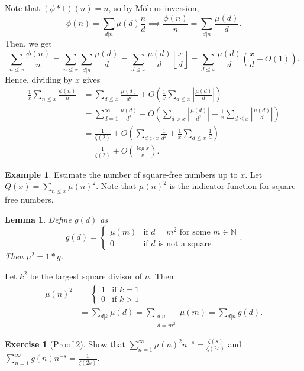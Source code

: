 \documentclass[11pt]{article}
\newtheorem{lemma}[thm]{Lemma}
\theoremstyle{definition}
\newtheorem{example}[thm]{Example}
\newtheorem{exe}[thm]{Exercise}
\newcommand{\floor}[1]{\left\lfloor #1 \right\rfloor}
\newcommand{\abs}[1]{\left\lvert#1\right\rvert} %
\newcommand{\NN}{\mathbb{N}}
\begin{document}
Note that $(\phi*1)(n)=n$, so by M\"obius inversion,
\[
\phi(n) = \sum_{d|n}\mu(d)\frac{n}d
\implies
\frac{\phi(n)}n = \sum_{d|n}\frac{\mu(d)}{d} .
\]
Then, we get
\[
\sum_{n\le x}\frac{\phi(n)}n
= \sum_{n\le x}\sum_{d|n} \frac{\mu(d)}d
= \sum_{d\le x}\frac{\mu(d)}d\floor{\frac{x}d}
= \sum_{d\le x}\frac{\mu(d)}d \left(\frac{x}{d}+O(1)\right) .
\]
Hence, dividing by $x$ gives
\begin{align*}
\frac1x\sum_{n\le x}\frac{\phi(n)}n
&= \sum_{d\le x}\frac{\mu(d)}{d^2}
+ O\left(\frac1x\sum_{d\le x}\abs{\frac{\mu(d)}{d}}\right) \\
&= \sum_{d=1}^\infty\frac{\mu(d)}{d^2}
+ O\left(\sum_{d>x}\abs{\frac{\mu(d)}{d^2}} + \frac1x\sum_{d\le
x}\abs{\frac{\mu(d)}d}\right) \\
&= \frac1{\zeta(2)} + O\left(\sum_{d>x}\frac1{d^2}+\frac1x\sum_{d\le x}\frac1d\right) \\
&= \frac1{\zeta(2)} + O\left(\frac{\log x}x\right) .
\end{align*}

\begin{example}
Estimate the number of square-free numbers up to $x$. Let $Q(x)=\sum_{n\le x} \mu(n)^2$.
Note that $\mu(n)^2$ is the indicator function for square-free numbers.
\end{example}

\begin{lemma}
Define $g(d)$ as
\[
g(d) = \begin{cases}
\mu(m) &\text{if }d=m^2\text{ for some }m\in\NN \\
0 &\text{if }d\text{ is not a square}
\end{cases} .
\]
Then $\mu^2=1*g$.
\end{lemma}
\proof[Proof 1]
Let $k^2$ be the largest square divisor of $n$. Then
\begin{align*}
\mu(n)^2 &= \begin{cases}
1 &\text{if }k=1 \\
0 &\text{if }k>1
\end{cases} \\
&= \sum_{d|k}\mu(d)
= \sum_{\substack{d|n\\d=m^2}}\mu(m)
= \sum_{d|n} g(d) .
\end{align*}
\qedhere

\begin{exe}[Proof 2]
Show that $\sum_{n=1}^\infty\mu(n)^2n^{-s}=\frac{\zeta(s)}{\zeta(2s)}$ and
$\sum_{n=1}^\infty g(n)n^{-s}=\frac1{\zeta(2s)}$.
\end{exe}
\end{document}
